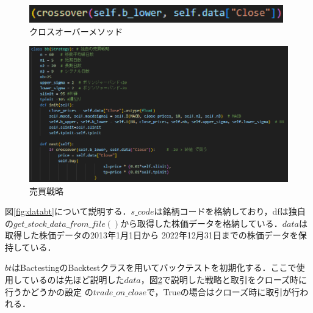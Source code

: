 \begin{description}
   \begin{figure}[H]
       \centering
       \includegraphics[width=110mm]{fig/crossover.png}
       \caption{クロスオーバーメソッド}
       \label{fig:cros}
      \end{figure}
      \begin{figure}[H]
        \centering
        \includegraphics[width=150mm]{fig/strategy.png}
        \caption{売買戦略}
        \label{fig:strat}
       \end{figure}
    

   図\ref{fig:databt}について説明する．\(s\_code\)は銘柄コードを格納しており，dfは独自の\(get\_stock\_data\_from\_file()\)から取得した株価データを格納している．$data$は取得した株価データの2013年1月1日から
   2022年12月31日までの株価データを保持している．
   
   $bt$はBactestingのBacktestクラスを用いてバックテストを初期化する．ここで使用しているのは先ほど説明した$data$，図\ref{fig:strat}で説明した戦略と取引をクローズ時に行うかどうかの設定
   の\(trade\_on\_close\)で，Trueの場合はクローズ時に取引が行われる．


\end{description}
